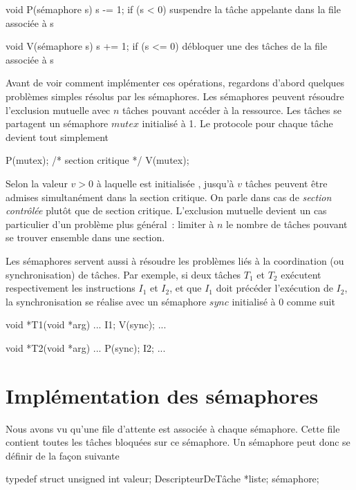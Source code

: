 \begin{codeblock}
void P(sémaphore s)
{
  s -= 1;
  if (s < 0)
    suspendre la tâche appelante dans la file associée à s
}

void V(sémaphore s)
{
  s += 1;
  if (s <= 0)
    débloquer une des tâches de la file associée à s
}
\end{codeblock}

\par
Avant de voir comment implémenter ces opérations, regardons d'abord quelques problèmes simples résolus par les sémaphores.
Les sémaphores peuvent résoudre l'exclusion mutuelle avec $n$ tâches pouvant accéder à la ressource.
Les tâches se partagent un sémaphore $mutex$ initialisé à 1.  Le protocole pour chaque tâche devient tout simplement
\begin{codeblock}
P(mutex);
/* section critique */
V(mutex);
\end{codeblock}

\par
Selon la valeur $v>0$ à laquelle est initialisée , jusqu'à $v$ tâches peuvent être admises simultanément dans la section critique.  On parle dans cas de {\em section contrôlée} plutôt que de section critique.  L'exclusion mutuelle devient un cas particulier d'un problème plus général~:  limiter à $n$ le nombre de tâches pouvant se trouver ensemble dans une section.

Les sémaphores servent aussi à résoudre les problèmes liés à la coordination (ou synchronisation) de tâches.  Par exemple, si deux tâches $T_1$ et $T_2$ exécutent respectivement les instructions $I_1$ et $I_2$, et que $I_1$ doit précéder l'exécution de $I_2$, la synchronisation se réalise avec un sémaphore $sync$ initialisé à 0 comme
suit
\begin{codeblock}
void *T1(void *arg) {
  ...
  I1;
  V(sync);
  ...
}
\end{codeblock}

\begin{codeblock}
void *T2(void *arg) {
  ...
  P(sync);
  I2;
  ...
}
\end{codeblock}

\section{Implémentation des sémaphores}
Nous avons vu qu'une file d'attente est associée à chaque sémaphore. Cette file contient toutes les tâches bloquées sur ce sémaphore.  Un sémaphore peut donc se définir de la façon suivante
\begin{codeblock}
typedef struct {
  unsigned int valeur;
  DescripteurDeTâche *liste;
} sémaphore;
\end{codeblock}

